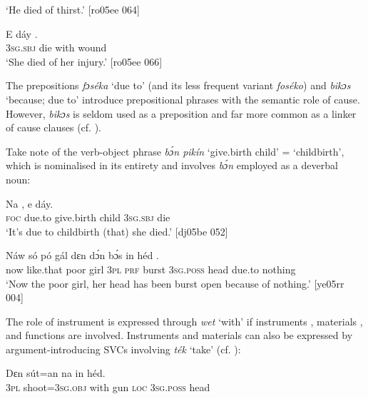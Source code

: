 \glt ‘He died of thirst.’ [ro05ee 064]
\z


\ea%
    \label{ex:key:1062}
    \gll E    dáy      .\\
\textsc{3sg.sbj}  die  with    wound\\

\glt ‘She died of her injury.’ [ro05ee 066]
\z

The prepositions \textit{fɔséka} ‘due to’ (and its less frequent variant \textit{foséko})  and \textit{bikɔs} ‘because; due to’  introduce prepositional phrases with the semantic role of cause. However, \textit{bikɔs} is seldom used as a preposition and far more common as a linker of cause clauses (cf. ). 


Take note of the verb-object phrase \textit{bɔ́n pikín} ‘give.birth child’ = ‘childbirth’, which is nominalised in its entirety and involves \textit{bɔ́n} employed as a deverbal noun: 



\ea%
    \label{ex:key:1063}
    \gll Na         ,  e    dáy.\\
\textsc{foc}  due.to  give.birth  child  \textsc{3sg.sbj}  die\\

\glt ‘It’s due to childbirth (that) she died.’ [dj05be 052]
\z


\ea%
    \label{ex:key:1064}
    \gll Náw  só    pó    gál  dɛn  dɔ́n  bɔ́s    in    héd
  .\\
now  like.that  poor  girl  \textsc{3pl}  \textsc{prf}  burst  \textsc{3sg.poss}  head
due.to  nothing\\

\glt ‘Now the poor girl, her head has been burst open 
because of nothing.’ [ye05rr 004]
\z

The role of instrument\index{} is expressed through \textit{wet} ‘with’ if instruments , material\index{}s , and functions  are involved. Instruments and materials can also be expressed by argument-introducing SVCs involving \textit{ték} ‘take’ (cf. ):


\ea%
    \label{ex:key:1065}
    \gll Dɛn  sút=an          na  in    héd.\\
\textsc{3pl}  shoot=\textsc{3sg.obj}  with    gun  \textsc{loc}  \textsc{3sg.poss}  head\\

